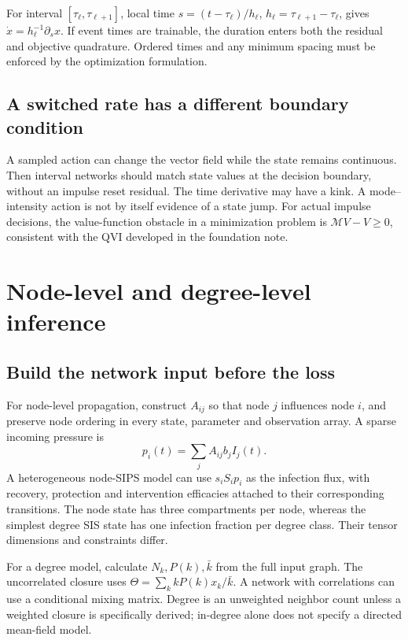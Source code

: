 \documentclass[11pt,a4paper]{article}
\theoremstyle{definition}
\theoremstyle{remark}
\begin{document}
For interval $[\tau_\ell,\tau_{\ell+1}]$, local time $s=(t-\tau_\ell)/h_\ell$, $h_\ell=\tau_{\ell+1}-\tau_\ell$, gives
$\dot x=h_\ell^{-1}\partial_s x$. If event times are trainable, the duration enters both the residual and objective quadrature. Ordered times and any minimum spacing must be enforced by the optimization formulation.

\subsection{A switched rate has a different boundary condition}
A sampled action can change the vector field while the state remains continuous. Then interval networks should match state values at the decision boundary, without an impulse reset residual. The time derivative may have a kink. A mode--intensity action is not by itself evidence of a state jump. For actual impulse decisions, the value-function obstacle in a minimization problem is $\mathcal MV-V\ge0$, consistent with the QVI developed in the foundation note.

\section{Node-level and degree-level inference}
\subsection{Build the network input before the loss}
For node-level propagation, construct $A_{ij}$ so that node $j$ influences node $i$, and preserve node ordering in every state, parameter and observation array. A sparse incoming pressure is
\begin{equation}
p_i(t)=\sum_jA_{ij}b_jI_j(t).
\end{equation}
A heterogeneous node-SIPS model can use $s_iS_ip_i$ as the infection flux, with recovery, protection and intervention efficacies attached to their corresponding transitions. The node state has three compartments per node, whereas the simplest degree SIS state has one infection fraction per degree class. Their tensor dimensions and constraints differ.

For a degree model, calculate $N_k,P(k),\bar k$ from the full input graph. The uncorrelated closure uses $\Theta=\sum_k kP(k)x_k/\bar k$. A network with correlations can use a conditional mixing matrix. Degree is an unweighted neighbor count unless a weighted closure is specifically derived; in-degree alone does not specify a directed mean-field model.
\end{document}
